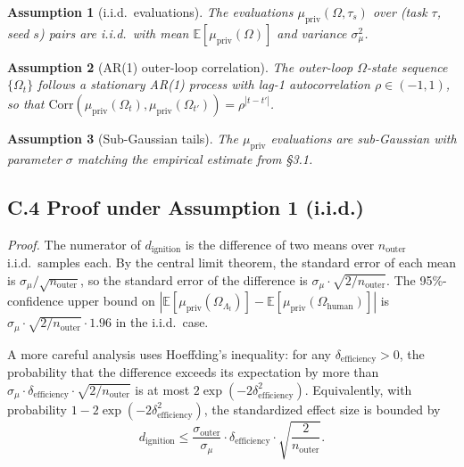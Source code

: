 \documentclass{article}
\newtheorem{assumption}{Assumption}
\theoremstyle{definition}
\begin{document}
\begin{assumption}[i.i.d.\ evaluations]\label{ass:iid}
The evaluations $\mu_{\text{priv}}(\Omega, \tau_s)$ over (task $\tau$, seed $s$) pairs are i.i.d.\ with mean $\mathbb{E}[\mu_{\text{priv}}(\Omega)]$ and variance $\sigma_\mu^2$.
\end{assumption}

\begin{assumption}[AR(1) outer-loop correlation]\label{ass:ar1}
The outer-loop $\Omega$-state sequence $\{\Omega_t\}$ follows a stationary AR(1) process with lag-1 autocorrelation $\rho \in (-1, 1)$, so that $\text{Corr}(\mu_{\text{priv}}(\Omega_t), \mu_{\text{priv}}(\Omega_{t'})) = \rho^{|t - t'|}$.
\end{assumption}

\begin{assumption}[Sub-Gaussian tails]
The $\mu_{\text{priv}}$ evaluations are sub-Gaussian with parameter $\sigma$ matching the empirical estimate from \S3.1.
\end{assumption}

\subsection*{C.4 Proof under Assumption 1 (i.i.d.)}

\textit{Proof.} The numerator of $d_{\text{ignition}}$ is the difference of two means over $n_{\text{outer}}$ i.i.d.\ samples each. By the central limit theorem, the standard error of each mean is $\sigma_\mu / \sqrt{n_{\text{outer}}}$, so the standard error of the difference is $\sigma_\mu \cdot \sqrt{2/n_{\text{outer}}}$. The 95\%-confidence upper bound on $|\mathbb{E}[\mu_{\text{priv}}(\Omega_{\Lambda_t})] - \mathbb{E}[\mu_{\text{priv}}(\Omega_{\text{human}})]|$ is $\sigma_\mu \cdot \sqrt{2/n_{\text{outer}}} \cdot 1.96$ in the i.i.d.\ case.

A more careful analysis uses Hoeffding's inequality: for any $\delta_{\text{efficiency}} > 0$, the probability that the difference exceeds its expectation by more than $\sigma_\mu \cdot \delta_{\text{efficiency}} \cdot \sqrt{2/n_{\text{outer}}}$ is at most $2 \exp(-2 \delta_{\text{efficiency}}^2)$. Equivalently, with probability $1 - 2 \exp(-2 \delta_{\text{efficiency}}^2)$, the standardized effect size is bounded by
\[
d_{\text{ignition}} \le \frac{\sigma_{\text{outer}}}{\sigma_\mu} \cdot \delta_{\text{efficiency}} \cdot \sqrt{\frac{2}{n_{\text{outer}}}}.
\]
\end{document}
